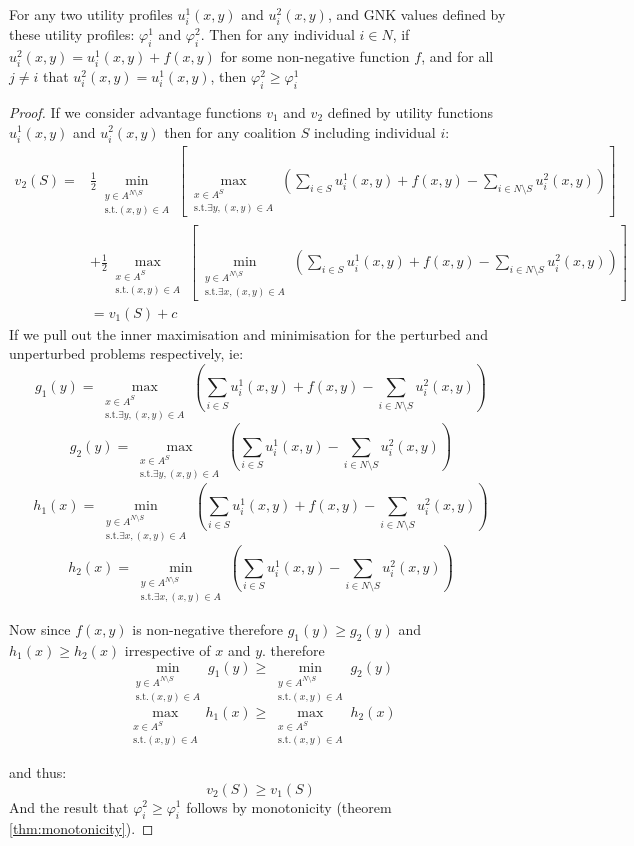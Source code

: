 \begin{theorem}
For any two utility profiles $u^1_i(x,y)$ and $u^2_i(x,y)$, and GNK values defined by these utility profiles: $\varphi_i^1$ and $\varphi_i^2$.
Then for any individual $i\in N$, if $u_i^2(x,y) = u_i^1(x,y)+f(x,y)$ for some non-negative function $f$, and for all $j\neq i$ that $u^2_i(x,y) = u^1_i(x,y)$, then $\varphi_i^2 \ge \varphi_i^1$ 
\end{theorem}
\begin{proof}
If we consider advantage functions $v_1$ and $v_2$ defined by utility functions $u_i^1(x,y)$ and $u_i^2(x,y)$ then for any coalition $S$ including individual $i$:
\begin{align}
v_2(S) = &
\frac{1}{2}\min_{\substack{y\in A^{N\setminus S} \\ \text{s.t.}(x,y)\in A}} \left[
\max_{\substack{x\in A^S \\ \text{s.t.}\exists y,(x,y)\in A}}
	\left(\sum_{i\in S} u^1_i(x,y)+f(x,y) - \sum_{i\in N\setminus S}u_i^2(x,y)\right)\right]\nonumber\\
& +
\frac{1}{2}\max_{\substack{x\in A^S \\ \text{s.t.}(x,y)\in A}} \left[
\min_{\substack{y\in A^{N\setminus S} \\ \text{s.t.}\exists x,(x,y)\in A}}
	\left(\sum_{i\in S} u^1_i(x,y)+f(x,y) - \sum_{i\in N\setminus S} u_i^2(x,y) \right) \right]\nonumber\\
&= v_1(S)+c\nonumber
\end{align}
If we pull out the inner maximisation and minimisation for the perturbed and unperturbed problems respectively, ie:
$$ g_1(y) = 
\max_{\substack{x\in A^S \\ \text{s.t.}\exists y,(x,y)\in A}}
	\left(\sum_{i\in S} u^1_i(x,y)+f(x,y) - \sum_{i\in N\setminus S}u_i^2(x,y)\right)
$$
$$g_2(y) = 
\max_{\substack{x\in A^S \\ \text{s.t.}\exists y,(x,y)\in A}}
	\left(\sum_{i\in S} u^1_i(x,y) - \sum_{i\in N\setminus S}u_i^2(x,y)\right) $$
$$h_1(x) = 
\min_{\substack{y\in A^{N\setminus S} \\ \text{s.t.}\exists x,(x,y)\in A}}
	\left(\sum_{i\in S} u^1_i(x,y)+f(x,y) - \sum_{i\in N\setminus S} u_i^2(x,y) \right)$$
$$h_2(x) = 
\min_{\substack{y\in A^{N\setminus S} \\ \text{s.t.}\exists x,(x,y)\in A}}
	\left(\sum_{i\in S} u^1_i(x,y) - \sum_{i\in N\setminus S} u_i^2(x,y) \right)$$

Now since $f(x,y)$ is non-negative therefore $g_1(y) \ge g_2(y)$ and $h_1(x) \ge h_2(x)$ irrespective of $x$ and $y$.
therefore
$$\min_{\substack{y\in A^{N\setminus S} \\ \text{s.t.}(x,y)\in A}}g_1(y) \ge \min_{\substack{y\in A^{N\setminus S} \\ \text{s.t.}(x,y)\in A}}g_2(y)$$
$$\max_{\substack{x\in A^S \\ \text{s.t.}(x,y)\in A}}h_1(x) \ge \max_{\substack{x\in A^S \\ \text{s.t.}(x,y)\in A}}h_2(x)$$

and thus:$$v_2(S) \ge v_1(S)$$
And the result that $\varphi_i^2 \ge \varphi_i^1$ follows by monotonicity (theorem \ref{thm:monotonicity}).
\end{proof}
